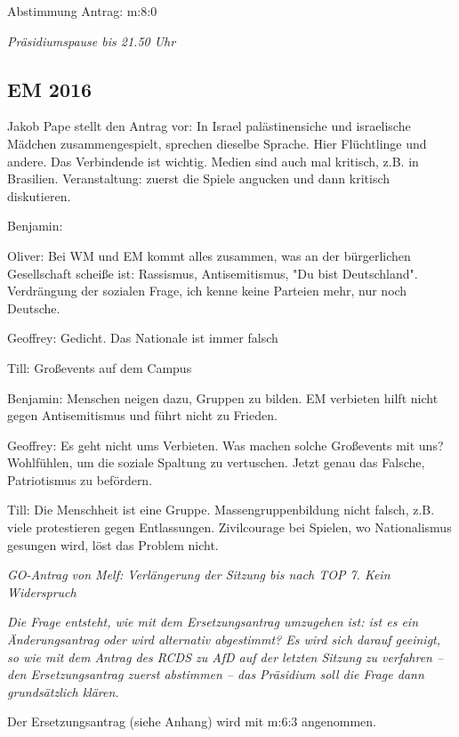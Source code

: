 \documentclass[ngerman,headheight=70pt]{scrartcl}
\begin{document}
    Abstimmung Antrag: m:8:0

    \textit{Präsidiumspause bis 21.50 Uhr}

    \subsection{EM 2016}

    Jakob Pape stellt den Antrag vor: In Israel palästinensiche und israelische
    Mädchen zusammengespielt, sprechen dieselbe Sprache. Hier Flüchtlinge und
    andere. Das Verbindende ist wichtig.
    Medien sind auch mal kritisch, z.B. in Brasilien. Veranstaltung: zuerst die
    Spiele angucken und dann kritisch diskutieren.

    Benjamin:

    Oliver: Bei WM und EM kommt alles zusammen, was an der bürgerlichen
    Gesellschaft scheiße ist: Rassismus, Antisemitismus, "Du bist Deutschland".
    Verdrängung der sozialen Frage, ich kenne keine Parteien mehr, nur noch Deutsche.

    Geoffrey: Gedicht. Das Nationale ist immer falsch

    Till: Großevents auf dem Campus

    Benjamin: Menschen neigen dazu, Gruppen zu bilden. EM verbieten hilft nicht
    gegen Antisemitismus und führt nicht zu Frieden.

    Geoffrey: Es geht nicht ums Verbieten. Was machen solche Großevents mit uns?
    Wohlfühlen, um die soziale Spaltung zu vertuschen. Jetzt genau das Falsche,
    Patriotismus zu befördern.

    Till: Die Menschheit ist eine Gruppe. Massengruppenbildung nicht falsch, z.B.
    viele protestieren gegen Entlassungen.
    Zivilcourage bei Spielen, wo Nationalismus gesungen wird, löst das Problem nicht.

    \textit{GO-Antrag von Melf: Verlängerung der Sitzung bis nach TOP 7.
    Kein Widerspruch}

    \textit{Die Frage entsteht, wie mit dem Ersetzungsantrag umzugehen ist: ist es ein
    Änderungsantrag oder wird alternativ abgestimmt?
    Es wird sich darauf geeinigt, so wie mit dem Antrag des RCDS zu AfD auf der
    letzten Sitzung zu verfahren – den Ersetzungsantrag zuerst abstimmen – das
    Präsidium soll die Frage dann grundsätzlich klären.}

    Der Ersetzungsantrag (siehe Anhang) wird mit m:6:3 angenommen.
\end{document}
